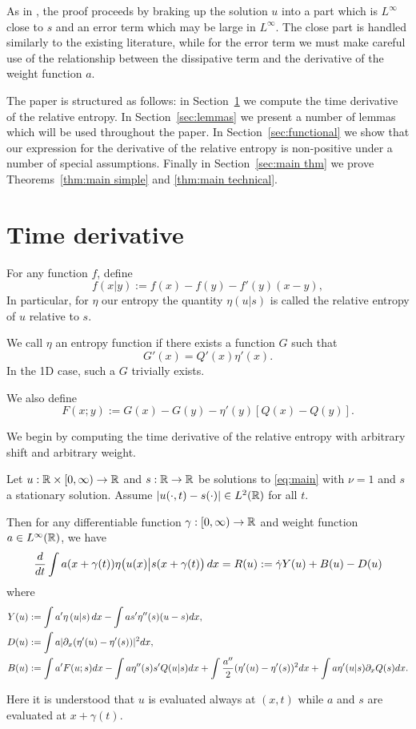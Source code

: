 As in \cite{KaVa.navier}, the proof proceeds by braking up the solution $u$ into a part which is $L^\infty$ close to $s$ and an error term which may be large in $L^\infty$.  The close part is handled similarly to the existing literature, while for the error term we must make careful use of the relationship between the dissipative term and the derivative of the weight function $a$.  

The paper is structured as follows: in Section~\ref{sec:prelim} we compute the time derivative of the relative entropy.  In Section~\ref{sec:lemmas} we present a number of lemmas which will be used throughout the paper.  In Section~\ref{sec:functional} we show that our expression for the derivative of the relative entropy is non-positive under a number of special assumptions.  Finally in Section~\ref{sec:main thm} we prove Theorems~\ref{thm:main simple} and \ref{thm:main technical}.  

\section{Time derivative} \label{sec:prelim}

For any function $f$, define
\[ f(x|y) := f(x) - f(y) - f'(y)(x-y),\]
In particular, for $\eta$ our entropy the quantity $\eta(u|s)$ is called the relative entropy of $u$ relative to $s$.  

We call $\eta$ an entropy function if there exists a function $G$ such that
\[ G'(x) = Q'(x) \eta'(x).\]
In the 1D case, such a $G$ trivially exists.  

We also define
\[ F(x;y) := G(x) - G(y) - \eta'(y)\left[ Q(x) - Q(y) \right].\]

We begin by computing the time derivative of the relative entropy with arbitrary shift and arbitrary weight. 

\begin{proposition}\label{thm:time derivative}
Let $u:\mathbb{R} \times [0,\infty) \to \mathbb{R}$ and $s:\mathbb{R} \to \mathbb{R}$ be solutions to \eqref{eq:main} with $\nu=1$ and $s$ a stationary solution.  Assume $\left\lvert u(\cdot,t) - s(\cdot) \right\rvert \in L^2(\mathbb{R})$ for all $t$.  

Then for any differentiable function $\gamma:[0,\infty) \to \mathbb{R}$ and weight function $a \in L^\infty(\mathbb{R})$, we have
\[ \frac{d}{dt} \int a(x+\gamma(t)) \eta\big(u(x)\big|s(x+\gamma(t)\big) \,dx = R(u) := \dot{\gamma} Y(u) + B(u) - D(u) \]
where
\begin{align*}
Y(u) &:= \int a' \eta\left(u|s\right) dx - \int a s' \eta''(s)(u-s) dx, \\
D(u) &:= \int a |\partial_x (\eta'(u) - \eta'(s))|^2 dx, \\
B(u) &:= \int a' F(u;s) dx - \int a \eta''(s)s'Q(u|s) dx + \int \frac{a''}{2} (\eta'(u) - \eta'(s))^2 dx  + \int a \eta'(u|s) \partial_x Q(s) dx.
\end{align*}

Here it is understood that $u$ is evaluated always at $(x,t)$ while $a$ and $s$ are evaluated at $x+\gamma(t)$.  
\end{proposition}

